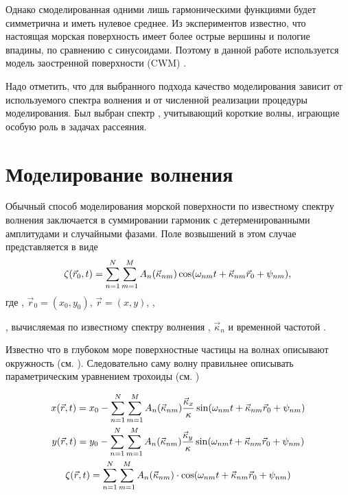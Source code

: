 Однако смоделированная одними лишь гармоническими функциями будет симметрична
и иметь нулевое среднее. Из экспериментов \cite{shuleykin} известно, что
настоящая морская поверхность имеет более острые вершины и пологие впадины, по
сравнению с синусоидами. Поэтому в данной работе используется модель
заостренной поверхности (CWM) \cite{nouguier}.


Надо отметить, что для выбранного подхода
качество моделирования зависит от используемого спектра волнения и от численной
реализации процедуры моделирования. Был выбран спектр \cite{ryabkova},
учитывающий короткие волны, играющие особую роль в задачах рассеяния.


\section*{Моделирование волнения}%

Обычный способ моделирования морской поверхности по известному спектру волнения
заключается в суммировании гармоник с детерменированными амплитудами и
случайными фазами. Поле возвышений в этом случае  представляется в виде
\begin{equation}
    \label{eq:surface3d_default}
    \zeta(\vec r_0,t) = \sum\limits_{n=1}^{N} \sum\limits_{m=1}^{M} A_n(\vec \kappa_{nm}) \cos(\omega_{nm}t + \vec \kappa_{nm}\vec r_0 + \psi_{nm}),    \\
\end{equation}
где ,  
$\vec r_0 = (x_0, y_0)$, $\vec r = (x, y)$, 
, 

, вычисляемая по известному спектру волнения \cite{ryabkova},
$\vec \kappa_n$ и временной частотой
 \cite{pustovoytenko}.


Известно что в глубоком море
поверхностные частицы на волнах описывают окружность (см. \cite{shuleykin}).
Следовательно саму волну правильнее описывать параметрическим уравнением
трохоиды (см. \cite{nouguier})

\begin{equation}
    \begin{gathered}
        \label{eq:surface3d_cwm}
        x(\vec r,t) = x_0 - \sum\limits_{n=1}^{N} \sum\limits_{m=1}^{M} A_n(\vec \kappa_{nm})\frac{\vec \kappa_x}{\kappa}        \sin(\omega_{nm}t + \vec \kappa_{nm}\vec r_0 + \psi_{nm})\\
        y(\vec r,t) = y_0 - \sum\limits_{n=1}^{N} \sum\limits_{m=1}^{M} A_n(\vec \kappa_{nm}) \frac{\vec \kappa_y}{\kappa}
        \sin(\omega_{nm}t + \vec \kappa_{nm}\vec r_0 + \psi_{nm})\\
        \zeta(\vec r,t) = \sum\limits_{n=1}^{N} \sum\limits_{m=1}^{M}
        A_n(\vec \kappa_{nm}) \cdot \cos(\omega_{nm}t + \vec \kappa_{nm}\vec r_0 + \psi_{nm})    \\
    \end{gathered}
\end{equation}

